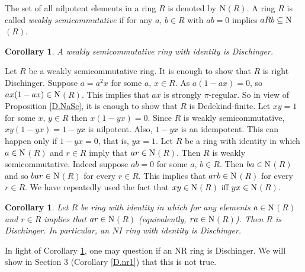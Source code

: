 \documentclass[12pt]{article}
\makeatletter
\theoremstyle{plain}
\newtheorem{cor}[thm]{Corollary}
\theoremstyle{definition}
\renewenvironment{proof}[1][\proofname]{%
	\par\pushQED{\qed}%
	\normalfont %
	\topsep6\p@\@plus6\p@\relax
	\trivlist
	\item[\hskip\labelsep\bfseries #1\@addpunct{.}]%
}{%
	\popQED\endtrivlist\@endpefalse
}
\renewcommand{\proofname}{Proof}
\makeatother
\begin{document}
	The set of all nilpotent elements in a ring $R$ is denoted by $\rm{N}$$(R)$. A ring $R$ is called {\em weakly semicommutative} if for any $a,\,b\in R$ with $ab = 0$ implies $aRb \subseteq \rm{N}$$(R)$. 
	\begin{cor}
		A weakly semicommutative ring with identity is Dischinger. 
	\end{cor}
	\begin{proof}
		Let $R$ be a weakly semicommutative ring. It is enough to show that $R$ is right Dischinger. Suppose $a = a^2x$ for some $a,\,x \in R$. As $a(1-ax)=0$, so $ax(1-ax) \in \rm{N}$$(R)$. This implies that $ax$ is strongly $\pi$-regular. So in view of Proposition \ref{D.NaSc}, it is enough to show that $R$ is Dedekind-finite. Let $xy = 1$ for some $x,\,y \in R$ then $x(1-yx) = 0$. Since $R$ is weakly semicommutative, $xy(1-yx) = 1-yx$ is nilpotent. Also, $1-yx$ is an idempotent. This can happen only if $1-yx = 0$, that is, $yx=1$. 
	\end{proof}
	Let $R$ be a ring with identity in which $a \in \rm{N}$$(R)$ and $r \in R$ imply that $ar \in \rm{N}$$(R)$. Then $R$ is weakly semicommutative. Indeed suppose $ab = 0$ for some $a, \, b \in R$. Then $ba \in \rm{N}$$(R)$ and so $bar \in \rm{N}$$(R)$ for every $r \in R$. This implies that $arb \in \rm{N}$$(R)$ for every $r \in R$. We have repeatedly used the fact that $xy \in \rm{N}$$(R)$ iff $yx \in \rm{N}$$(R)$. 
	\begin{cor}\label{D.NI}
		Let $R$ be ring with identity in which for any elements $a \in \rm{N}$$(R)$ and $r \in R$ implies that $ar \in \rm{N}$$(R)$ (equivalently, $ra \in \rm{N}$$(R)$). Then $R$ is Dischinger. In particular, an $NI$ ring with identity is Dischinger.
	\end{cor} 
	
	In light of Corollary \ref{D.NI}, one may question if an NR ring is Dischinger. We will show in Section 3 (Corollary \ref{D.nr1}) that this is not true.
	
\end{document}
